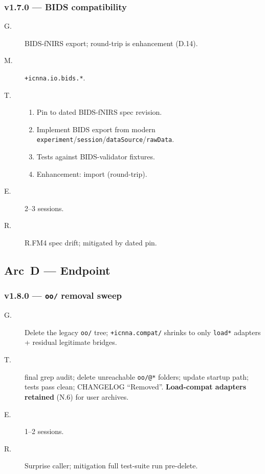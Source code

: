 \documentclass[11pt,a4paper]{article}
\begin{document}
\subsubsection*{v1.7.0 --- BIDS compatibility}

\begin{description}
    \item[G.] BIDS-fNIRS export; round-trip is enhancement (D.14).
    \item[M.] \texttt{+icnna.io.bids.*}.
    \item[T.]
        \begin{enumerate}[nosep]
            \item Pin to dated BIDS-fNIRS spec revision.
            \item Implement BIDS export from modern \texttt{experiment}/\texttt{session}/\texttt{dataSource}/\texttt{rawData}.
            \item Tests against BIDS-validator fixtures.
            \item Enhancement: import (round-trip).
        \end{enumerate}
    \item[E.] 2--3 sessions.
    \item[R.] R.FM4 spec drift; mitigated by dated pin.
\end{description}

\subsection{Arc~D --- Endpoint}

\subsubsection*{v1.8.0 --- \texttt{oo/} removal sweep}

\begin{description}
    \item[G.] Delete the legacy \texttt{oo/} tree; \texttt{+icnna.compat/} shrinks to only \texttt{load*} adapters + residual legitimate bridges.
    \item[T.] final grep audit; delete unreachable \texttt{oo/@*} folders; update startup path; tests pass clean; CHANGELOG ``Removed''. \textbf{Load-compat adapters retained} (N.6) for user archives.
    \item[E.] 1--2 sessions.
    \item[R.] Surprise caller; mitigation full test-suite run pre-delete.
\end{description}
\end{document}
